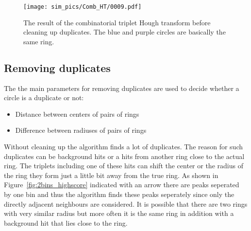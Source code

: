 \documentclass[11pt]{scrreprt}
\begin{document}
\begin{figure}[htb]
  \centering
  \texttt{[image: sim\_pics/Comb\_HT/0009.pdf]}
  \caption{The result of the combinatorial triplet Hough transform before cleaning up duplicates. The blue and purple circles are basically the same ring.}
  \label{fig:comb_ht_0009}
\end{figure}


\subsection{Removing duplicates} %
\label{ssub:getting_rid_of_duplicates}

The the main parameters for removing duplicates are used to decide whether a circle is a duplicate or not:
\begin{itemize}
  \item Distance between centers of pairs of rings
  \item Difference between radiuses of pairs of rings
\end{itemize}




Without cleaning up the algorithm finds a lot of duplicates. The reason for such duplicates can be background hits or a hits from another 
ring close to the actual ring. The triplets including one of these hits can shift the center or the radius of the ring
they form just a little bit away from the true ring. As shown in Figure~\ref{fig:2bins_highscore} indicated with an arrow there are peaks seperated by one bin and thus the algorithm finds these peaks seperately since only the directly adjacent neighbours are considered. It is possible that there are two
rings with very similar radius but more often it is the same ring in addition with a background hit that lies close to the ring.
\end{document}
